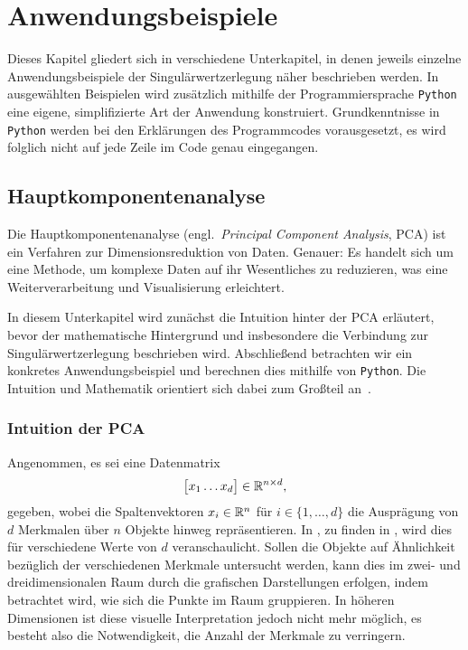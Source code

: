 \chapter{Anwendungsbeispiele}   
Dieses Kapitel gliedert sich in verschiedene Unterkapitel, in denen jeweils einzelne Anwendungsbeispiele der Singulärwertzerlegung näher beschrieben werden.
In ausgewählten Beispielen wird zusätzlich mithilfe der Programmiersprache \texttt{Python} eine eigene, simplifizierte Art der Anwendung konstruiert.
Grundkenntnisse in \texttt{Python} werden bei den Erklärungen des Programmcodes vorausgesetzt, es wird folglich nicht auf jede Zeile im Code genau eingegangen.

\section{Hauptkomponentenanalyse}

Die Hauptkomponentenanalyse (engl.\ \textit{Principal Component Analysis}, PCA) ist ein Verfahren zur Dimensionsreduktion von Daten.
Genauer: Es handelt sich um eine Methode, um komplexe Daten auf ihr Wesentliches zu reduzieren, was eine Weiterverarbeitung und Visualisierung erleichtert.

In diesem Unterkapitel wird zunächst die Intuition hinter der PCA erläutert, bevor der mathematische Hintergrund und insbesondere die Verbindung zur Singulärwertzerlegung beschrieben wird.
Abschließend betrachten wir ein konkretes Anwendungsbeispiel und berechnen dies mithilfe von \texttt{Python}.
Die Intuition und Mathematik orientiert sich dabei zum Großteil an~\cite[S.~165-169]{ngMachineLearningCS2292023}.

\subsection{Intuition der PCA}
Angenommen, es sei eine Datenmatrix
\begin{equation*}
    \big[
        \begin{matrix}
            x_1 \dots x_d
        \end{matrix}    
    \big] \in \mathbb{R}^{n \times d},
\end{equation*}
gegeben, wobei die Spaltenvektoren \(x_i \in \mathbb{R}^{n}\) für \(i \in \{1,\ldots,d\}\) die Ausprägung von \(d\) Merkmalen über \(n\) Objekte hinweg repräsentieren.
In , zu finden in , wird dies für verschiedene Werte von \(d\) veranschaulicht.
Sollen die Objekte auf Ähnlichkeit bezüglich der verschiedenen Merkmale untersucht werden, kann dies im zwei- und dreidimensionalen Raum durch die grafischen Darstellungen erfolgen, indem betrachtet wird, wie sich die Punkte im Raum gruppieren.
In höheren Dimensionen ist diese visuelle Interpretation jedoch nicht mehr möglich, es besteht also die Notwendigkeit, die Anzahl der Merkmale zu verringern.

